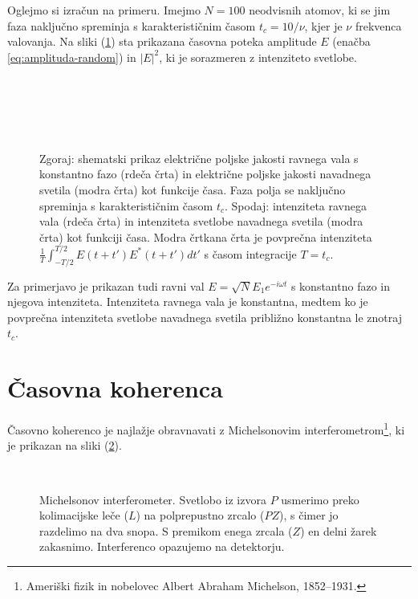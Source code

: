 Oglejmo si izračun
na primeru. Imejmo $N=100$ neodvisnih atomov, ki se jim faza naključno
spreminja s karakterističnim časom $t_{c}=10/\nu$, kjer je $\nu$
frekvenca valovanja. Na sliki (\ref{fig:amplituda-intenziteta}) sta
prikazana časovna poteka amplitude $E$ (enačba \ref{eq:amplituda-random})
in $|E|^{2}$, ki je sorazmeren z intenziteto svetlobe.
\begin{figure}
\centering
\def\svgwidth{150truemm} 
\\
\def\svgwidth{150truemm} 
\\
\def\svgwidth{150truemm} 
\\
\def\svgwidth{150truemm} 
\\
\caption{Zgoraj: shematski prikaz električne poljske jakosti 
ravnega vala s konstantno fazo (rdeča črta) in električne
poljske jakosti navadnega svetila (modra črta) kot funkcije
časa. Faza polja se naključno spreminja s karakterističnim časom $t_{c}$.
Spodaj: intenziteta ravnega vala (rdeča črta) in intenziteta
svetlobe navadnega svetila (modra črta) kot funkciji
časa. Modra črtkana črta je povprečna intenziteta 
$\frac{1}{T}\int_{-T/2}^{T/2}E(t+t')E^{*}(t+t')dt'$
s časom integracije $T=t_{c}$. }
\label{fig:amplituda-intenziteta}
\end{figure}
Za primerjavo je prikazan tudi ravni val $E=\sqrt{N}E_{1}e^{-i\omega t}$
s konstantno fazo in njegova intenziteta. Intenziteta ravnega vala je konstantna, 
medtem ko je povprečna intenziteta svetlobe navadnega svetila približno 
konstantna le znotraj $t_{c}$.

\section{Časovna koherenca}
\label{sec:casovna-koherenca}

Časovno koherenco je najlažje obravnavati 
z Michelsonovim 
interferometrom\footnote{Ameriški fizik in nobelovec Albert Abraham Michelson, 1852--1931.},
ki je prikazan na sliki (\ref{fig:michelson}). 
\begin{figure}[!h]
\centering
\def\svgwidth{85truemm} 
\\
\caption{\label{fig:michelson}Michelsonov interferometer. Svetlobo
iz izvora $P$ usmerimo preko kolimacijske leče ($L$) na polprepustno
zrcalo ($PZ$), s čimer jo razdelimo na dva snopa. S premikom
enega zrcala ($Z$) en delni žarek zakasnimo. Interferenco opazujemo na detektorju.}
\end{figure}

